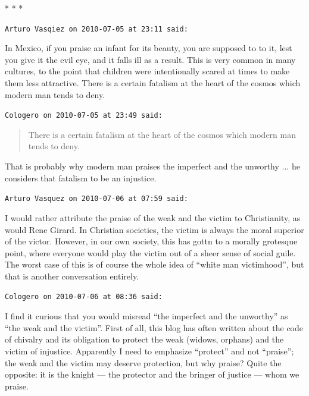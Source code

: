 
\begin{center}* * *\end{center}

\begin{footnotesize}
\begin{sffamily}
\texttt{Arturo Vasqiez on 2010-07-05 at 23:11 said:}

In Mexico, if you praise an infant for its beauty, you are supposed to to it, lest you give it the evil eye, and it falls ill as a result. This is very common in many cultures, to the point that children were intentionally scared at times to make them less attractive. There is a certain fatalism at the heart of the cosmos which modern man tends to deny.

\hfill

\texttt{Cologero on 2010-07-05 at 23:49 said:}

\begin{quote}\footnotesize

There is a certain fatalism at the heart of the cosmos which modern man tends to deny.
\end{quote}


That is probably why modern man praises the imperfect and the unworthy ... he considers that fatalism to be an injustice.


\hfill

\texttt{Arturo Vasquez on 2010-07-06 at 07:59 said:}

I would rather attribute the praise of the weak and the victim to Christianity, as would Rene Girard. In Christian societies, the victim is always the moral superior of the victor. However, in our own society, this has gottn to a morally grotesque point, where everyone would play the victim out of a sheer sense of social guile. The worst case of this is of course the whole idea of ``white man victimhood'', but that is another conversation entirely.

\hfill

\texttt{Cologero on 2010-07-06 at 08:36 said:}

I find it curious that you would misread ``the imperfect and the unworthy'' as ``the weak and the victim''. First of all, this blog has often written about the code of chivalry and its obligation to protect the weak (widows, orphans) and the victim of injustice. Apparently I need to emphasize ``protect'' and not ``praise''; the weak and the victim may deserve protection, but why praise? Quite the opposite: it is the knight --- the protector and the bringer of justice --- whom we praise.


\end{sffamily}
\end{footnotesize}
